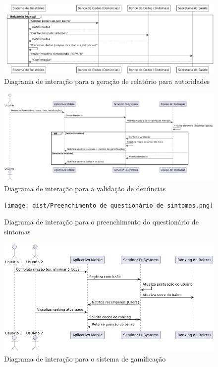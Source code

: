 \documentclass[a4paper, 12pt]{article}
\begin{document}
\begin{figure}[H]
    \centering
    \includegraphics[width=1\textwidth]{dist/Geração de relatório para autoridades.png}
    \caption{Diagrama de interação para a geração de relatório para autoridades}
    \label{fig:autoridades}
\end{figure}

\begin{figure}[H]
    \centering
    \includegraphics[width=1\textwidth]{dist/Validação de denúncia.png}
    \caption{Diagrama de interação para a validação de denúncias}
    \label{fig:denuncias}
\end{figure}

\begin{figure}[H]
    \centering
    \texttt{[image: dist/Preenchimento de questionário de sintomas.png]}
    \caption{Diagrama de interação para o preenchimento do questionário de sintomas}
    \label{fig:sintomas}
\end{figure}

\begin{figure}[H]
    \centering
    \includegraphics[width=1\textwidth]{dist/Sistema de gamificação.png}
    \caption{Diagrama de interação para o sistema de gamificação}
    \label{fig:gamefy}
\end{figure}
\end{document}
